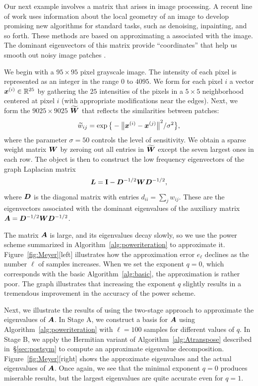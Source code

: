 \documentclass[final]{siamltex}
\newcounter{algorithm}[section]
\newcommand{\pgnotate}[1]{{\color{blue}[#1]}}
\begin{document}
Our next example involves a matrix that arises in image processing.
A recent line of work uses information about the local geometry
of an image to develop promising new algorithms for standard tasks,
such as denoising, inpainting, and so forth.  These
methods are based on approximating a 
associated with the image. The dominant eigenvectors of this
matrix provide ``coordinates'' that help us smooth out noisy
image patches \cite{Szlam08,Shen08}.

We begin with a $95 \times 95$ pixel grayscale image. The intensity
of each pixel is represented as an integer in the range $0$ to $4095$.
We form for each pixel $i$ a vector $\bm{x}^{(i)} \in \mathbb{R}^{25}$
by gathering the $25$ intensities of the pixels in a $5 \times 5$ neighborhood
centered at pixel $i$ (with appropriate modifications near the edges).
Next, we form the $9025 \times 9025$ 
$\widetilde{\bm{W}}$ that reflects the similarities between patches:
$$
\widetilde{w}_{ij} = \exp\big\{-{\bigl\Vert { \bm{x}^{(i)} - \bm{x}^{(j)} } \bigr\Vert}_{}^2 / \sigma^2 \big\},
$$
where the parameter $\sigma = 50$ controls the level
of sensitivity. We obtain a sparse weight matrix $\bm{W}$ by
zeroing out all entries in $\widetilde{\bm{W}}$ except the seven
largest ones in each row.  The object is then to construct the low
frequency eigenvectors of the graph Laplacian matrix
$$
\bm{L} = \mathbf{I} - \bm{D}^{-1/2} \bm{W} \bm{D}^{-1/2},
$$
where $\bm{D}$ is the diagonal matrix with entries $d_{ii} = \sum_j w_{ij}$.
These are the eigenvectors associated with the dominant eigenvalues of
the auxiliary matrix $\bm{A} = \bm{D}^{-1/2} \bm{W} \bm{D}^{-1/2}$.

The matrix $\bm{A}$ is large, and its eigenvalues decay slowly,
so we use the power scheme summarized in Algorithm~\ref{alg:poweriteration}
to approximate it.
Figure~\ref{fig:Meyer}[left] illustrates how the approximation error $e_{\ell}$
declines as the number $\ell$ of samples increases.
When we set the exponent $q = 0$, which corresponds with the basic Algorithm~\ref{alg:basic},
the approximation is rather poor.
The graph illustrates that increasing the exponent $q$ slightly results
in a tremendous improvement in the accuracy of the power scheme.

Next, we illustrate the results of using the two-stage approach to
approximate the eigenvalues of $\bm{A}$.
In Stage A, we construct a basis for $\bm{A}$ using
Algorithm~\ref{alg:poweriteration} with $\ell = 100$ samples
for different values of $q$.
In Stage B, we apply the Hermitian variant of Algorithm~\ref{alg:Atranspose}
described in~\S\ref{sec:postsym}
to compute an approximate eigenvalue decomposition.
Figure~\ref{fig:Meyer}[right] shows the approximate eigenvalues
and the actual eigenvalues of $\bm{A}$.
Once again, we see that the minimal exponent $q = 0$
produces miserable results, but
the largest eigenvalues are quite accurate
even for $q=1$.
\end{document}
